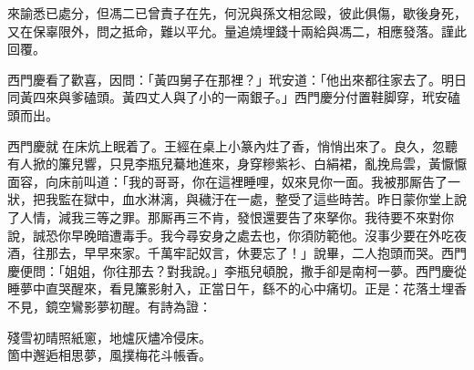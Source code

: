 \begin{myquote}[\markfont]
來諭悉已處分，但馮二已曾責子在先，何況與孫文相忿毆，彼此俱傷，歇後身死，又在保辜限外，問之抵命，難以平允。量追燒埋錢十兩給與馮二，相應發落。謹此回覆。

\end{myquote}

西門慶看了歡喜，因問：「黃四舅子在那裡？」玳安道：「他出來都往家去了。明日同黃四來與爹磕頭。黃四丈人與了小的一兩銀子。」西門慶分付置鞋脚穿，玳安磕頭而出。

西門慶就𢱉在床炕上眠着了。王經在桌上小篆內炷了香，悄悄出來了。良久，忽聽有人掀的簾兒響，只見李瓶兒驀地進來，身穿糝紫衫、白絹裙，亂挽烏雲，黃懨懨面容，向床前叫道：「我的哥哥，你在這裡睡哩，奴來見你一面。我被那厮告了一狀，把我監在獄中，血水淋漓，與穢汙在一處，整受了這些時苦。昨日蒙你堂上說了人情，{}減我三等之罪。那厮再三不肯，發恨還要告了來拏你。我待要不來對你說，誠恐你早晚暗遭毒手。{}我今尋安身之處去也，你須防範他。沒事少要在外吃夜酒，往那去，早早來家。千萬牢記奴言，休要忘了！」說畢，二人抱頭而哭。西門慶便問：「姐姐，你往那去？對我說。」李瓶兒頓脫，撒手卻是南柯一夢。西門慶從睡夢中直哭醒來，看見簾影射入，正當日午，繇不的心中痛切。正是：花落土埋香不見，鏡空鸞影夢初醒。有詩為證：

\begin{myquote} 
殘雪初晴照紙窻，地爐灰燼冷侵床。\\箇中邂逅相思夢，風撲梅花斗帳香。
\end{myquote} 

